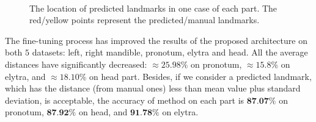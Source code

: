 \documentclass[review]{elsarticle}
\begin{document}
\begin{figure}[h!]
    \centering
    ~~
    \\
    \caption{The location of predicted landmarks in one case of each part. The red/yellow points represent the predicted/manual landmarks.}
    \label{figpdl}
\end{figure}

The fine-tuning process has improved the results of the proposed
architecture on both $5$ datasets: left, right mandible, pronotum,
elytra and head. All the average distances have significantly
decreased: $\approx 25.98\%$ on pronotum, $\approx 15.8\%$ on elytra,
and $\approx 18.10\%$  on head part. Besides, if we consider a
predicted landmark, which has the distance (from manual ones) less
than mean value plus standard deviation, is acceptable, the accuracy
of method on each part is $\textbf{87.07\%}$ on pronotum,
$\textbf{87.92\%}$ on head, and $\textbf{91.78\%}$ on elytra.
\end{document}
